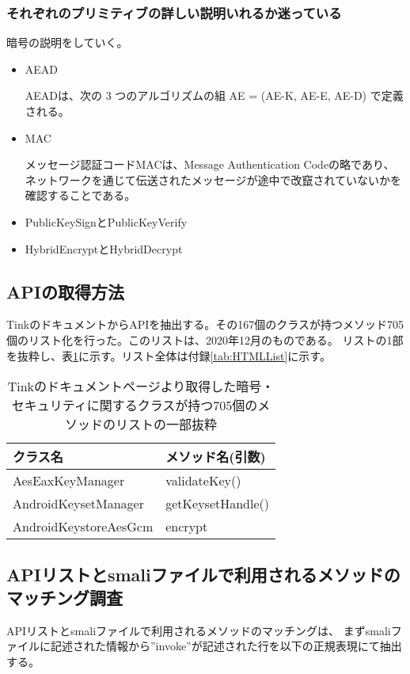 \subsubsection{それぞれのプリミティブの詳しい説明いれるか迷っている}
暗号の説明をしていく。
\begin{itemize}
\item AEAD

AEADは、次の 3 つのアルゴリズムの組 AE = (AE-K, AE-E, AE-D) で定義される。

\item MAC

メッセージ認証コードMACは、Message Authentication Codeの略であり、ネットワークを通じて伝送されたメッセージが途中で改竄されていないかを確認することである。

\item PublicKeySignとPublicKeyVerify

\item HybridEncryptとHybridDecrypt

\end{itemize}
\fi
\subsection{APIの取得方法}
Tinkのドキュメント\cite{Tink Cryptography}からAPIを抽出する。その167個のクラスが持つメソッド705個のリスト化を行った。このリストは、2020年12月のものである。
リストの1部を抜粋し、表\ref{tb:APImethod}に示す。リスト全体は付録\ref{tab:HTMLList}に示す。

\begin{table}[t]
\begin{center}
\caption{Tinkのドキュメントページより取得した暗号・セキュリティに関するクラスが持つ705個のメソッドのリストの一部抜粋}
\begin{tabular}{ll} \hline
クラス名 & メソッド名(引数) \\ \hline
AesEaxKeyManager & validateKey() \\
AndroidKeysetManager & getKeysetHandle() \\
AndroidKeystoreAesGcm &  encrypt\\ \hline
\end{tabular}
\label{tb:APImethod}
\end{center}
\end{table}



\subsection{APIリストとsmaliファイルで利用されるメソッドのマッチング調査}
APIリストとsmaliファイルで利用されるメソッドのマッチングは、
まずsmaliファイルに記述された情報から”invoke”が記述された行を以下の正規表現にて抽出する。

